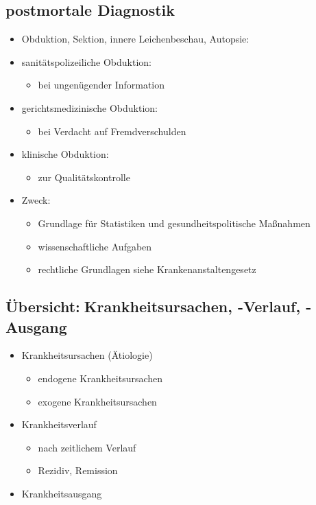 \begin{it>emize}
\subsection{postmortale Diagnostik}
	\begin{itemize}
		\item Obduktion, Sektion, innere Leichenbeschau, Autopsie:
		\item sanitätspolizeiliche Obduktion:
			\begin{itemize}
				\item bei ungenügender Information
			\end{itemize}
		\item gerichtsmedizinische Obduktion:
			\begin{itemize}
				\item bei Verdacht auf Fremdverschulden
			\end{itemize}
		\item klinische Obduktion:
			\begin{itemize}
				\item zur Qualitätskontrolle
			\end{itemize}
		\item Zweck:
			\begin{itemize}
				\item Grundlage für Statistiken und gesundheitspolitische Maßnahmen
				\item wissenschaftliche Aufgaben
				\item rechtliche Grundlagen siehe Krankenanstaltengesetz
			\end{itemize}
	\end{itemize}

\subsection{Übersicht:Krankheitsursachen, -Verlauf, -Ausgang}
	\begin{itemize}
		\item Krankheitsursachen (Ätiologie)
			\begin{itemize}
				\item endogene Krankheitsursachen
				\item exogene Krankheitsursachen
			\end{itemize}
		\item Krankheitsverlauf
			\begin{itemize}
				\item nach zeitlichem Verlauf
				\item Rezidiv, Remission
			\end{itemize}
		\item Krankheitsausgang
	\end{itemize}


\end{it>emize}
